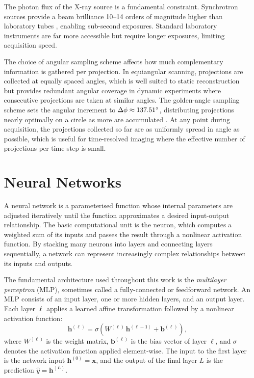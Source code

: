 \documentclass[12pt, a4paper, twoside]{report}
\begin{document}
The photon flux of the X-ray source is a fundamental constraint. Synchrotron sources provide a beam brilliance 10--14 orders of magnitude higher than laboratory tubes \citep{withers2021ct}, enabling sub-second exposures. Standard laboratory instruments are far more accessible but require longer exposures, limiting acquisition speed.

The choice of angular sampling scheme affects how much complementary information is gathered per projection. In equiangular scanning, projections are collected at equally spaced angles, which is well suited to static reconstruction but provides redundant angular coverage in dynamic experiments where consecutive projections are taken at similar angles. The golden-angle sampling scheme sets the angular increment to $\Delta\phi \approx 137.51\degree$, distributing projections nearly optimally on a circle as more are accumulated \citep{kohler2004golden}. At any point during acquisition, the projections collected so far are as uniformly spread in angle as possible, which is useful for time-resolved imaging where the effective number of projections per time step is small.

\section{Neural Networks}
\label{sec:nn}

A neural network is a parameterised function whose internal parameters are adjusted iteratively until the function approximates a desired input-output relationship. The basic computational unit is the neuron, which computes a weighted sum of its inputs and passes the result through a nonlinear activation function. By stacking many neurons into layers and connecting layers sequentially, a network can represent increasingly complex relationships between its inputs and outputs.

The fundamental architecture used throughout this work is the \emph{multilayer perceptron} (MLP), sometimes called a fully-connected or feedforward network. An MLP consists of an input layer, one or more hidden layers, and an output layer. Each layer $\ell$ applies a learned affine transformation followed by a nonlinear activation function:
%
\begin{equation}
    \mathbf{h}^{(\ell)} = \sigma\!\left( W^{(\ell)}\, \mathbf{h}^{(\ell-1)} + \mathbf{b}^{(\ell)} \right),
    \label{eq:mlp_layer}
\end{equation}
%
where $W^{(\ell)}$ is the weight matrix, $\mathbf{b}^{(\ell)}$ is the bias vector of layer $\ell$, and $\sigma$ denotes the activation function applied element-wise. The input to the first layer is the network input $\mathbf{h}^{(0)} = \mathbf{x}$, and the output of the final layer $L$ is the prediction $\hat{y} = \mathbf{h}^{(L)}$.
\end{document}
